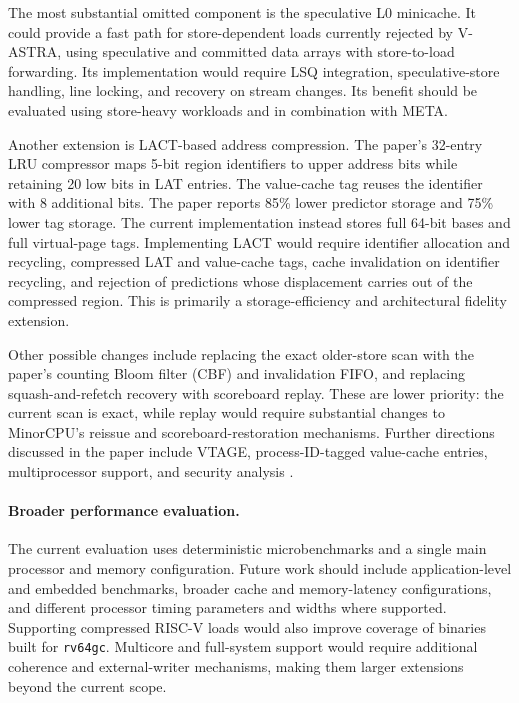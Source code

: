 The most substantial omitted component is the speculative L0
minicache. It could provide a fast path for store-dependent loads
currently rejected by V-ASTRA, using speculative and committed data
arrays with store-to-load forwarding. Its implementation would
require LSQ integration, speculative-store handling, line locking,
and recovery on stream changes. Its benefit should be evaluated
using store-heavy workloads and in combination with META.

Another extension is LACT-based address compression. The paper's
32-entry LRU compressor maps 5-bit region identifiers to upper
address bits while retaining 20 low bits in LAT entries. The
value-cache tag reuses the identifier with 8 additional bits. The
paper reports 85\% lower predictor storage and 75\% lower tag
storage. The current implementation instead stores full 64-bit
bases and full virtual-page tags. Implementing LACT would require
identifier allocation and recycling, compressed LAT and value-cache
tags, cache invalidation on identifier recycling, and rejection of
predictions whose displacement carries out of the compressed
region. This is primarily a storage-efficiency and architectural
fidelity extension.

Other possible changes include replacing the exact older-store scan
with the paper's counting Bloom filter (CBF) and invalidation FIFO,
and replacing squash-and-refetch recovery with scoreboard replay.
These are lower priority: the current scan is exact, while replay
would require substantial changes to MinorCPU's reissue and
scoreboard-restoration mechanisms. Further directions discussed
in the paper include VTAGE, process-ID-tagged value-cache entries,
multiprocessor support, and security analysis
\cite{ravenel2025architecting}.

\paragraph{Broader performance evaluation.}

The current evaluation uses deterministic microbenchmarks and a
single main processor and memory configuration. Future work should
include application-level and embedded benchmarks, broader cache
and memory-latency configurations, and different processor timing
parameters and widths where supported. Supporting compressed
RISC-V loads would also improve coverage of binaries built for
\texttt{rv64gc}. Multicore and full-system support would require
additional coherence and external-writer mechanisms, making them
larger extensions beyond the current scope.
